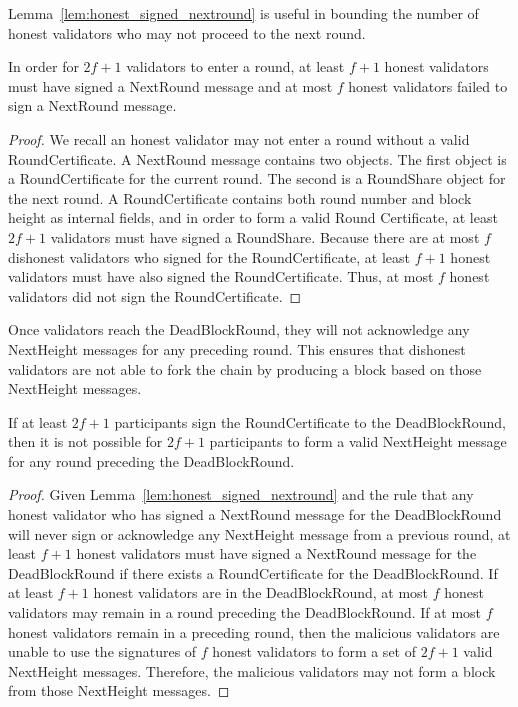 Lemma~\ref{lem:honest_signed_nextround}
is useful in bounding the number of honest validators who may not
proceed to the next round.

\begin{lem}
\label{lem:honest_signed_nextround}
In order for $2f+1$ validators to enter a round, at least $f+1$
honest validators must have signed a NextRound message and at most $f$
honest validators failed to sign a NextRound message.
\end{lem}

\begin{proof}
We recall an honest validator may not enter a round without a valid
RoundCertificate.
A NextRound message contains two objects.
The first object is a RoundCertificate for the current round.
The second is a RoundShare object for the next round.
A RoundCertificate contains both round number and block height as internal
fields, and in order to form a valid Round Certificate, at least $2f+1$
validators must have signed a RoundShare.
Because there are at most $f$ dishonest validators who signed for the
RoundCertificate, at least $f+1$ honest validators must have also signed the
RoundCertificate.
Thus, at most $f$ honest validators did not sign the RoundCertificate.
\end{proof}

Once validators reach the DeadBlockRound, they will not acknowledge any
NextHeight messages for any preceding round.
This ensures that dishonest validators are not able to fork the chain by
producing a block based on those NextHeight messages.

\begin{lem}
\label{lem:sign_rc_dbr}
If at least $2f+1$ participants sign the RoundCertificate to the DeadBlockRound,
then it is not possible for $2f+1$ participants to form a valid NextHeight
message for any round preceding the DeadBlockRound.
\end{lem}

\begin{proof}
Given Lemma~\ref{lem:honest_signed_nextround}
and the rule that any honest validator who has signed a
NextRound message for the DeadBlockRound will never sign or acknowledge any
NextHeight message from a previous round, at least $f+1$ honest validators must
have signed a NextRound message for the DeadBlockRound if there exists a
RoundCertificate for the DeadBlockRound.
If at least $f+1$ honest validators are in the DeadBlockRound,
at most $f$ honest validators may remain in a round preceding
the DeadBlockRound.
If at most $f$ honest validators remain in a preceding round, then the malicious
validators are unable to use the signatures of $f$ honest validators to form a
set of $2f+1$ valid NextHeight messages.
Therefore, the malicious validators may not form a block from those NextHeight
messages.
\end{proof}

